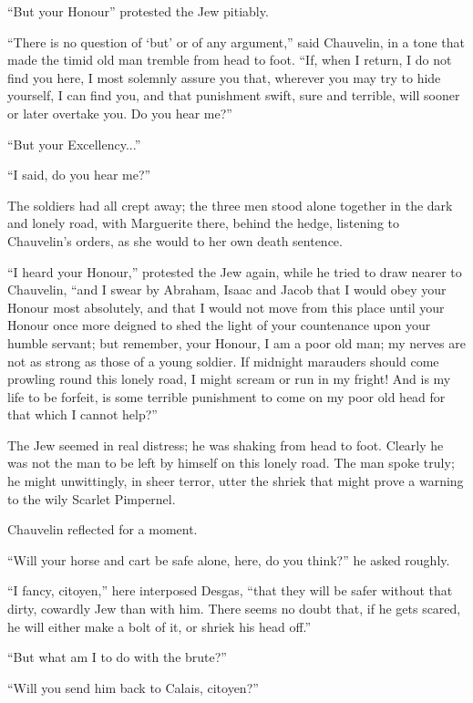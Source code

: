 \enquote{But your Honour\longdash} protested the Jew pitiably.

\enquote{There is no question of \enquote{but} or of any argument,} said Chauvelin, in a tone that made the timid old man tremble from head to foot. \enquote{If, when I return, I do not find you here, I most solemnly assure you that, wherever you may try to hide yourself, I can find you, and that punishment swift, sure and terrible, will sooner or later overtake you. Do you hear me?}

\enquote{But your Excellency...}

\enquote{I said, do you hear me?}

The soldiers had all crept away; the three men stood alone together in the dark and lonely road, with Marguerite there, behind the hedge, listening to Chauvelin's orders, as she would to her own death sentence.

\enquote{I heard your Honour,} protested the Jew again, while he tried to draw nearer to Chauvelin, \enquote{and I swear by Abraham, Isaac and Jacob that I would obey your Honour most absolutely, and that I would not move from this place until your Honour once more deigned to shed the light of your countenance upon your humble servant; but remember, your Honour, I am a poor old man; my nerves are not as strong as those of a young soldier. If midnight marauders should come prowling round this lonely road, I might scream or run in my fright! And is my life to be forfeit, is some terrible punishment to come on my poor old head for that which I cannot help?}

The Jew seemed in real distress; he was shaking from head to foot. Clearly he was not the man to be left by himself on this lonely road. The man spoke truly; he might unwittingly, in sheer terror, utter the shriek that might prove a warning to the wily Scarlet Pimpernel.

Chauvelin reflected for a moment.

\enquote{Will your horse and cart be safe alone, here, do you think?} he asked roughly.

\enquote{I fancy, citoyen,} here interposed Desgas, \enquote{that they will be safer without that dirty, cowardly Jew than with him. There seems no doubt that, if he gets scared, he will either make a bolt of it, or shriek his head off.}

\enquote{But what am I to do with the brute?}

\enquote{Will you send him back to Calais, citoyen?}

